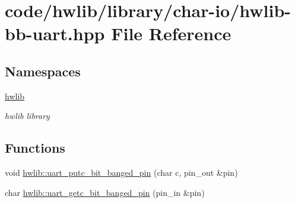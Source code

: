 \hypertarget{hwlib-bb-uart_8hpp}{}\section{code/hwlib/library/char-\/io/hwlib-\/bb-\/uart.hpp File Reference}
\label{hwlib-bb-uart_8hpp}
\subsection*{Namespaces}
\begin{DoxyCompactItemize}
\item 
 \hyperlink{namespacehwlib}{hwlib}
\begin{DoxyCompactList}\small\item\em hwlib library \end{DoxyCompactList}\end{DoxyCompactItemize}
\subsection*{Functions}
\begin{DoxyCompactItemize}
\item 
void \hyperlink{namespacehwlib_a68a0d1b033eb1a830df4b2cbdd7ff281}{hwlib\+::uart\+\_\+putc\+\_\+bit\+\_\+banged\+\_\+pin} (char c, pin\+\_\+out \&pin)
\item 
char \hyperlink{namespacehwlib_a9e4a38353bdbb18425459cddb55b185e}{hwlib\+::uart\+\_\+getc\+\_\+bit\+\_\+banged\+\_\+pin} (pin\+\_\+in \&pin)
\end{DoxyCompactItemize}
